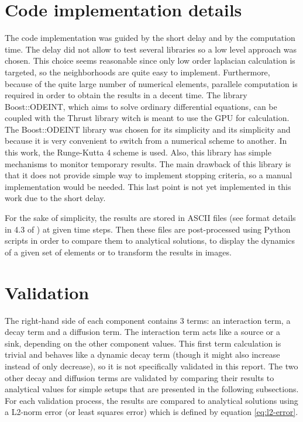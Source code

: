 \documentclass[a4paper]{article}
\begin{document}
\section{Code implementation details}
\label{sec:implementation}

The code implementation was guided by the short delay and by the computation time. The delay did not allow to test several libraries so a low level approach was chosen. This choice seems reasonable since only low order laplacian calculation is targeted, so the neighborhoods are quite easy to implement. Furthermore, because of the quite large number of numerical elements, parallele computation is required in order to obtain the results in a decent time. The library Boost::ODEINT, which aims to solve ordinary differential equations, can be coupled with the Thrust library witch is meant to use the GPU for calculation. The Boost::ODEINT library was chosen for its simplicity and its simplicity and because it is very convenient to switch from a numerical scheme to another. In this work, the Runge-Kutta 4 scheme is used. Also, this library has simple mechanisms to monitor temporary results. The main drawback of this library is that it does not provide simple way to implement stopping criteria, so a manual implementation would be needed. This last point is not yet implemented in this work due to the short delay.

For the sake of simplicity, the results are stored in ASCII files (see format details in 4.3 of \cite{tecplot_dataformat_guide}) at given time steps. Then these files are post-processed using Python scripts in order to compare them to analytical solutions, to display the dynamics of a given set of elements or to transform the results in images.

\section{Validation}
\label{sec:validation}

The right-hand side of each component contains 3 terms: an interaction term, a decay term and a diffusion term. The interaction term acts like a source or a sink, depending on the other component values. This first term calculation is trivial and behaves like a dynamic decay term (though it might also increase instead of only decrease), so it is not specifically validated in this report. The two other decay and diffusion terms are validated by comparing their results to analytical values for simple setups that are presented in the following subsections. For each validation process, the results are compared to analytical solutions using a L2-norm error (or least squares error) which is defined by equation \ref{eq:l2-error}.
\end{document}
